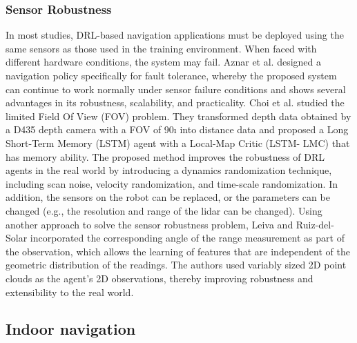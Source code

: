 \subsubsection{Sensor Robustness}
In most studies, DRL-based navigation applications must be deployed using the same sensors as those used in the training environment. When faced with different hardware conditions, the system may fail. Aznar et al.\cite{aznar2019} designed a navigation policy specifically for fault tolerance, whereby the proposed system can continue to work normally under sensor failure conditions and shows several advantages in its robustness, scalability, and practicality. Choi et al.\cite{choi2019} studied the limited Field Of View (FOV) problem. They transformed depth data obtained by a D435 depth camera with a FOV of 90ı into distance data and proposed a Long Short-Term Memory (LSTM) agent with a Local-Map Critic (LSTM- LMC) that has memory ability. The proposed method improves the robustness of DRL agents in the real world by introducing a dynamics randomization technique, including scan noise, velocity randomization, and time-scale randomization. In addition, the sensors on the robot
can be replaced, or the parameters can be changed (e.g., the resolution and range of the lidar can be changed). Using another approach to solve the sensor robustness problem, Leiva and Ruiz-del-Solar\cite{leiva2020} incorporated the corresponding angle of the range measurement as part of the observation, which allows the learning of features that are independent of the geometric distribution of the readings. The authors used variably sized 2D point clouds as the agent’s 2D observations, thereby improving robustness and extensibility to the real world.


\subsection{Indoor navigation}
